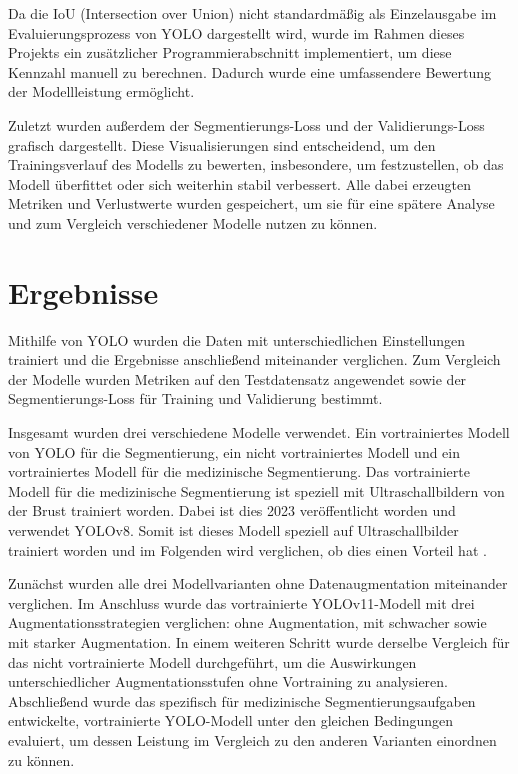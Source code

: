 \documentclass[
	german,
	accentcolor=10c,%
	type=intern,
	marginpar=false
	]{tudapub}
\begin{document}
Da die IoU (Intersection over Union) nicht standardmäßig als Einzelausgabe im Evaluierungsprozess von YOLO dargestellt wird, wurde im Rahmen dieses Projekts ein zusätzlicher Programmierabschnitt implementiert, um diese Kennzahl manuell zu berechnen. Dadurch wurde eine umfassendere Bewertung der Modellleistung ermöglicht. 

Zuletzt wurden außerdem der Segmentierungs-Loss und der Validierungs-Loss grafisch dargestellt.
Diese Visualisierungen sind entscheidend, um den Trainingsverlauf des Modells zu bewerten, insbesondere, um festzustellen, ob das Modell überfittet oder sich weiterhin stabil verbessert. Alle dabei erzeugten Metriken und Verlustwerte wurden gespeichert, um sie für eine spätere Analyse und zum Vergleich verschiedener Modelle nutzen zu können.

\section{Ergebnisse}
Mithilfe von YOLO wurden die Daten mit unterschiedlichen Einstellungen trainiert und die Ergebnisse anschließend miteinander verglichen. Zum Vergleich der Modelle wurden Metriken auf den Testdatensatz angewendet sowie der Segmentierungs-Loss für Training und Validierung bestimmt. 

Insgesamt wurden drei verschiedene Modelle verwendet. Ein vortrainiertes Modell von YOLO für die Segmentierung, ein nicht vortrainiertes Modell und ein vortrainiertes Modell für die medizinische Segmentierung. Das vortrainierte Modell für die medizinische Segmentierung ist speziell mit Ultraschallbildern von der Brust trainiert worden. Dabei ist dies 2023 veröffentlicht worden und verwendet YOLOv8. Somit ist dieses Modell speziell auf Ultraschallbilder trainiert worden und im Folgenden wird verglichen, ob dies einen Vorteil hat \cite{medical_imaging}.

Zunächst wurden alle drei Modellvarianten ohne Datenaugmentation miteinander verglichen.
Im Anschluss wurde das vortrainierte YOLOv11-Modell mit drei Augmentationsstrategien verglichen: ohne Augmentation, mit schwacher sowie mit starker Augmentation.
In einem weiteren Schritt wurde derselbe Vergleich für das nicht vortrainierte Modell durchgeführt, um die Auswirkungen unterschiedlicher Augmentationsstufen ohne Vortraining zu analysieren. Abschließend wurde das spezifisch für medizinische Segmentierungsaufgaben entwickelte, vortrainierte YOLO-Modell unter den gleichen Bedingungen evaluiert, um dessen Leistung im Vergleich zu den anderen Varianten einordnen zu können.
\end{document}
